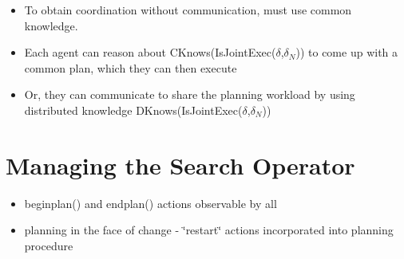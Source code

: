 \begin{itemize}
\item To obtain coordination without communication, must use common knowledge. 
\item Each agent can reason about CKnows(IsJointExec($\delta$,$\delta_{N}$))
to come up with a common plan, which they can then execute 
\item Or, they can communicate to share the planning workload by using distributed
knowledge DKnows(IsJointExec($\delta$,$\delta_{N}$)) 
\end{itemize}

\section{Managing the Search Operator}

\begin{itemize}
\item beginplan() and endplan() actions observable by all 
\item planning in the face of change - \char`\"{}restart\char`\"{} actions
incorporated into planning procedure 
\end{itemize}

